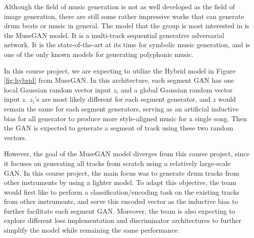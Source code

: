 \begin{par}
    \par \hspace{15pt} Although the field of music generation is not as well developed as the field of image generation, there are still some rather impressive works that can generate drum beats or music in general. The model that the group is most interested in is the MuseGAN \cite{musegan} model. It is a multi-track sequential generative adversarial network. It is the state-of-the-art at its time for symbolic music generation, and is one of the only known models for generating polyphonic music. 

    \par In this course project, we are expecting to utilize the Hybrid model in Figure \ref{fig:hybrid} from MuseGAN. In this architecture, each segment GAN has one local Gaussian random vector input $z_i$ and a global Gaussian random vector input $z$. $z_i$'s are most likely different for each segment generator, and $z$ would remain the same for each segment generators, serving as an artificial inductive bias for all generator to produce more style-aligned music for a single song. Then the GAN is expected to generate a segment of track using these two random vectors. 

    \par However, the goal of the MuseGAN model diverges from this course project, since it focuses on generating all tracks from scratch using a relatively large-scale GAN. In this course project, the main focus was to generate drum tracks from other instruments by using a lighter model. To adapt this objective, the team would first like to perform a classification/encoding task on the existing tracks from other instruments, and serve this encoded vector as the inductive bias to further facilitate each segment GAN. Moreover, the team is also expecting to explore different loss implementation and discriminator architectures to further simplify the model while remaining the same performance. 

    


\end{par}
